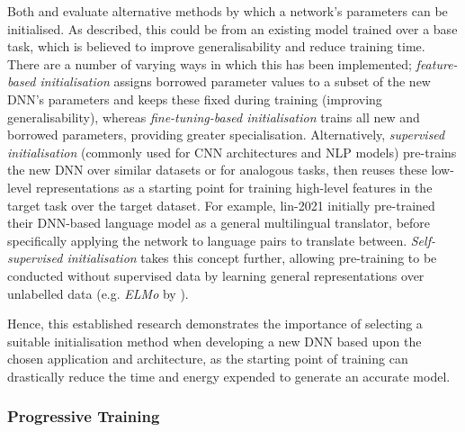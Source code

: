 \documentclass[a4paper, 11pt]{report}
\begin{document}
    Both \citet{hanin-2018} and \citet{xu-2021} evaluate alternative methods by which a network's parameters can be initialised. As described, this could be from an existing model trained over a base task, which is believed to improve generalisability and reduce training time. There are a number of varying ways in which this has been implemented; \emph{feature-based initialisation} assigns borrowed parameter values to a subset of the new DNN's parameters and keeps these fixed during training (improving generalisability), whereas \emph{fine-tuning-based initialisation} trains all new and borrowed parameters, providing greater specialisation. Alternatively, \emph{supervised initialisation} (commonly used for CNN architectures and NLP models) pre-trains the new DNN over similar datasets or for analogous tasks, then reuses these low-level representations as a starting point for training high-level features in the target task over the target dataset. For example, lin-2021 initially pre-trained their DNN-based language model as a general multilingual translator, before specifically applying the network to language pairs to translate between. \emph{Self-supervised initialisation} takes this concept further, allowing pre-training to be conducted without supervised data by learning general representations over unlabelled data (e.g. \emph{ELMo} by \citet{peters-2018}).

    Hence, this established research demonstrates the importance of selecting a suitable initialisation method when developing a new DNN based upon the chosen application and architecture, as the starting point of training can drastically reduce the time and energy expended to generate an accurate model.


    \subsubsection{Progressive Training}
\end{document}
